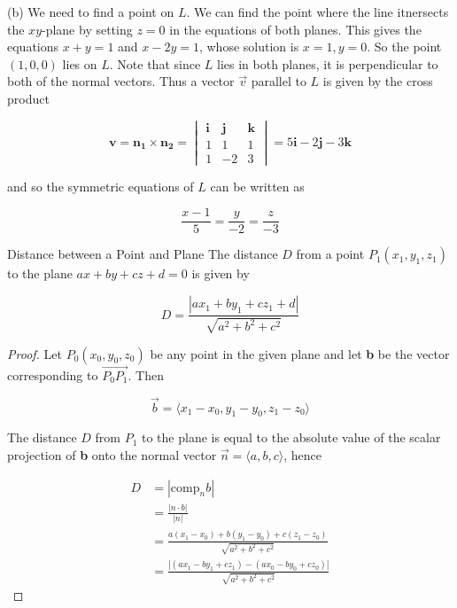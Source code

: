         (b) We need to find a point on $L$. We can find the point where the line itnersects the $xy$-plane by setting $z=0$ in the equations of both planes. This gives the equations $x+y=1$ and $x-2y=1$, whose solution
        is $x=1,y=0$. So the point $(1,0,0)$ lies on $L$. Note that since $L$ lies in both planes, it is perpendicular to both of the normal vectors. Thus a vector $\vec{v}$ parallel to $L$ is given by the cross product

        \[
            \mathbf{v = n_1 \times n_2} =
            \begin{vmatrix}
                \mathbf{i}  & \mathbf{j}    & \mathbf{k} \\
                1           & 1             & 1 \\
                1           & -2            & 3
            \end{vmatrix}
            = 5\mathbf{i} - 2\mathbf{j} - 3\mathbf{k}
        \]

        and so the symmetric equations of $L$ can be written as

        \[
            \frac{x-1}{5} = \frac{y}{-2} = \frac{z}{-3}
        \]

        \begin{theorem}{Distance between a Point and Plane}
            The distance $D$ from a point $P_1(x_1,y_1,z_1)$ to the plane $ax + by + cz + d = 0$ is given by

            \[
                D = \frac{|ax_1 + by_1 + cz_1 + d|}{\sqrt{a^2 + b^2 + c^2}}
            \]
        \end{theorem}

        \begin{proof}
            Let $P_0(x_0, y_0, z_0)$ be any point in the given plane and let \textbf{b} be the vector corresponding to $\vec{P_0 P_1}$. Then

            \[
                \vec{b} = \langle x_1 - x_0, y_1 - y_0, z_1 - z_0\rangle
            \]

            The distance $D$ from $P_1$ to the plane is equal to the absolute value of the scalar projection of \textbf{b} onto the normal vector $\vec{n} = \langle a, b, c\rangle$, hence

            \begin{align*}
                D   &= |\text{comp}_n b| \\
                &= \frac{|n\cdot b|}{|n|} \\
                &= \frac{a(x_1 - x_0) + b(y_1 - y_0) + c(z_1 - z_0)}{\sqrt{a^2 + b^2 + c^2}} \\
                &= \frac{|(ax_1 - by_1 + cz_1) - (ax_0 - by_0 + cz_0)|}{\sqrt{a^2 + b^2 + c^2}}
            \end{align*}

        \end{proof}

